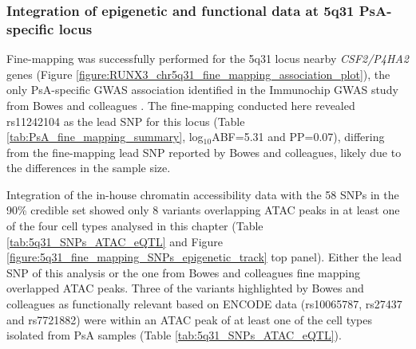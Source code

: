 \subsubsection{Integration of epigenetic and functional data at 5q31 PsA-specific locus}
Fine-mapping was successfully performed for the 5q31 locus nearby \textit{CSF2/P4HA2} genes (Figure \ref{figure:RUNX3_chr5q31_fine_mapping_association_plot}), the only PsA-specific GWAS association identified in the Immunochip GWAS study from Bowes and colleagues \parencite{Bowes2015}. The fine-mapping conducted here revealed rs11242104 as the lead SNP for this locus (Table \ref{tab:PsA_fine_mapping_summary}, log$_{10}$ABF=5.31 and PP=0.07), differing from the fine-mapping lead SNP reported by Bowes and colleagues, likely due to the differences in the sample size.



Integration of the in-house chromatin accessibility data with the 58 SNPs in the 90\% credible set showed only 8 variants overlapping ATAC peaks in at least one of the four cell types analysed in this chapter (Table \ref{tab:5q31_SNPs_ATAC_eQTL} and Figure \ref{figure:5q31_fine_mapping_SNPs_epigenetic_track} top panel). Either the lead SNP of this analysis or the one from Bowes and colleagues fine mapping overlapped ATAC peaks. Three of the variants highlighted by Bowes and colleagues as functionally relevant based on ENCODE data (rs10065787, rs27437 and rs7721882) were within an ATAC peak of at least one of the cell types isolated from PsA samples (Table \ref{tab:5q31_SNPs_ATAC_eQTL}). 


